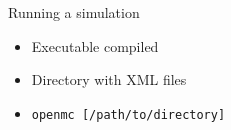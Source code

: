\documentclass[serif]{beamer}
\begin{document}

\begin{frame}{Running a simulation}
  \begin{itemize}
  \item<1-> Executable compiled
  \item<1-> Directory with XML files
  \item<1-> \texttt{openmc [/path/to/directory]}
  \end{itemize}
\end{frame}

\end{document}
